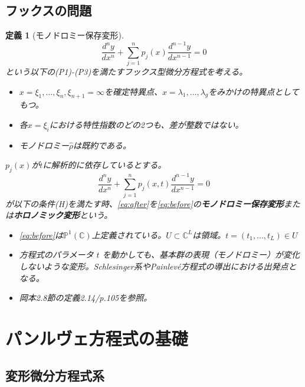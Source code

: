 \documentclass[paper=a4, fontsize=11pt]{jlreq} %
\theoremstyle{break}
\newtheorem{definition}[theorem]{定義}
\theoremstyle{qa}
\theoremstyle{remark} %
\begin{document}
\subsection{フックスの問題}

\begin{definition}[モノドロミー保存変形]\label{mono_deform}
    \begin{equation}\label{eq:before}
    \frac{d^{n}y}{dx^{n}}+\sum_{j=1}^{n} p_{j}(x)\frac{d^{n-1}y}{dx^{n-1}} = 0   
    \end{equation}
    という以下の(P1)-(P3)を満たすフックス型微分方程式を考える。
    \begin{itemize}
        \item[(P1)] $x=\xi_{1},...,\xi_{n},\xi_{n+1}=\infty$を確定特異点、$x=\lambda_{1},...,\lambda_{g}$をみかけの特異点としてもつ。
        \item[(P2)] 各$x=\xi_{i}$における特性指数のどの2つも、差が整数ではない。
        \item[(P3)] モノドロミー$\hat{\rho}$は既約である。
    \end{itemize}
    $p_{j}(x)$が$t$に解析的に依存しているとする。
    \begin{equation}\label{eq:after}
    \frac{d^{n}y}{dx^{n}}+\sum_{j=1}^{n} p_{j}(x,t)\frac{d^{n-1}y}{dx^{n-1}} = 0   
    \end{equation}
    が以下の条件(H)を満たす時、\eqref{eq:after}を\eqref{eq:before}の\textbf{モノドロミー保存変形}または\textbf{ホロノミック変形}という。
    \begin{itemize}
        \item[\textbf{Type:}] \eqref{eq:before}は$\mathbb{P}^{1}(\mathbb{C})$上定義されている。$U\subset\mathbb{C}^{L}$は領域。$t=(t_{1},...,t_{L})\in U$
        \item[\textbf{Insight:}] 方程式のパラメータ $t$ を動かしても、基本群の表現（モノドロミー）が変化しないような変形。Schlesinger系やPainlevé方程式の導出における出発点となる。
        \item[\textbf{Link:}] 岡本2.8節の定義2.14/p.105を参照。
    \end{itemize}
\end{definition}

\section{パンルヴェ方程式の基礎}

\subsection{変形微分方程式系}
\end{document}
